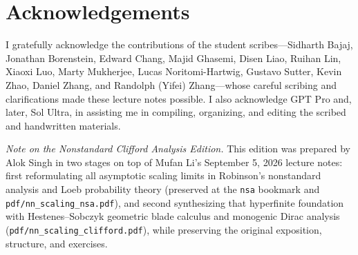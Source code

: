 \chapter*{Acknowledgements}

I gratefully acknowledge the contributions of the student scribes---Sidharth Bajaj, Jonathan Borenstein, Edward Chang, Majid Ghasemi, Disen Liao, Ruihan Lin, Xiaoxi Luo, Marty Mukherjee, Lucas Noritomi-Hartwig, Gustavo Sutter, Kevin Zhao, Daniel Zhang, and Randolph (Yifei) Zhang---whose careful scribing and clarifications made these lecture notes possible. I also acknowledge GPT Pro and, later, Sol Ultra, in assisting me in compiling, organizing, and editing the scribed and handwritten materials.

\medskip
\noindent\emph{Note on the Nonstandard Clifford Analysis Edition.} This edition was prepared by Alok Singh in two stages on top of Mufan Li's September 5, 2026 lecture notes: first reformulating all asymptotic scaling limits in Robinson's nonstandard analysis and Loeb probability theory (preserved at the \texttt{nsa} bookmark and \texttt{pdf/nn\_scaling\_nsa.pdf}), and second synthesizing that hyperfinite foundation with Hestenes--Sobczyk geometric blade calculus and monogenic Dirac analysis (\texttt{pdf/nn\_scaling\_clifford.pdf}), while preserving the original exposition, structure, and exercises.
